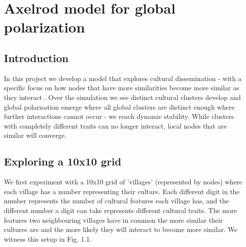 \chapter{Axelrod model for global polarization }



\section{Introduction}

    In this project we develop a model that explores cultural dissemination - with a specific focus on how nodes that have more similarities become more similar as they interact \cite{Axelrod1997}. Over the simulation we see distinct cultural clusters develop and global polarisation emerge where all global clusters are distinct enough where further interactions cannot occur - we reach dynamic stability. While clusters with completely different traits can no longer interact, local nodes that are similar will converge.

\section{Exploring a 10x10 grid}

    We first experiment with a 10x10 grid of 'villages' (represented by nodes) where each village has a number representing their culture. Each different digit in the number represents the number of cultural features each village has, and the different number a digit can take represents different cultural traits. The more features two neighbouring villages have in common the more similar their cultures are and the more likely they will interact to become more similar. We witness this setup in Fig. 1.1.

